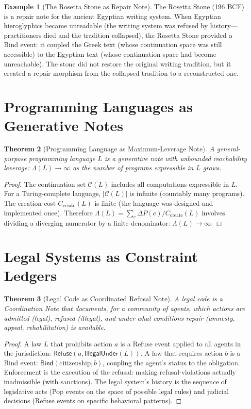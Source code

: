 \documentclass[12pt, a4paper, openany]{book}
\theoremstyle{plain}
\newtheorem{theorem}{Theorem}[chapter]
\theoremstyle{definition}
\newtheorem{example}[theorem]{Example}
\theoremstyle{remark}
\newcommand{\Refuse}{\mathsf{Refuse}}
\newcommand{\Bind}{\mathsf{Bind}}
\newcommand{\calC}{\mathcal{C}}
\begin{document}
\begin{example}[The Rosetta Stone as Repair Note]
The Rosetta Stone (196 BCE) is a repair note for the ancient Egyptian writing
system. When Egyptian hieroglyphics became unreadable (the writing system was
refused by history---practitioners died and the tradition collapsed), the
Rosetta Stone provided a Bind event: it coupled the Greek text (whose
continuation space was still accessible) to the Egyptian text (whose continuation
space had become unreachable). The stone did not restore the original writing
tradition, but it created a repair morphism from the collapsed tradition to
a reconstructed one.
\end{example}

\section{Programming Languages as Generative Notes}

\begin{theorem}[Programming Language as Maximum-Leverage Note]
A general-purpose programming language $L$ is a generative note with unbounded
reachability leverage: $\Lambda(L) \to \infty$ as the number of programs
expressible in $L$ grows.
\end{theorem}

\begin{proof}
The continuation set $\calC(L)$ includes all computations expressible in $L$.
For a Turing-complete language, $|\calC(L)|$ is infinite (countably many
programs). The creation cost $C_{\mathrm{create}}(L)$ is finite (the language
was designed and implemented once). Therefore $\Lambda(L) = \sum_c \Delta P(c) /
C_{\mathrm{create}}(L)$ involves dividing a diverging numerator by a finite
denominator: $\Lambda(L) \to \infty$.
\end{proof}

\section{Legal Systems as Constraint Ledgers}

\begin{theorem}[Legal Code as Coordinated Refusal Note]
A legal code is a Coordination Note that documents, for a community of agents,
which actions are admitted (legal), refused (illegal), and under what conditions
repair (amnesty, appeal, rehabilitation) is available.
\end{theorem}

\begin{proof}
A law $L$ that prohibits action $a$ is a Refuse event applied to all agents
in the jurisdiction: $\Refuse(a, \mathsf{IllegalUnder}(L))$. A law that
requires action $b$ is a Bind event: $\Bind(\text{citizenship}, b)$, coupling
the agent's status to the obligation. Enforcement is the execution of the
refusal: making refusal-violations actually inadmissible (with sanctions). The
legal system's history is the sequence of legislative acts (Pop events on the
space of possible legal rules) and judicial decisions (Refuse events on specific
behavioral patterns).
\end{proof}
\end{document}

